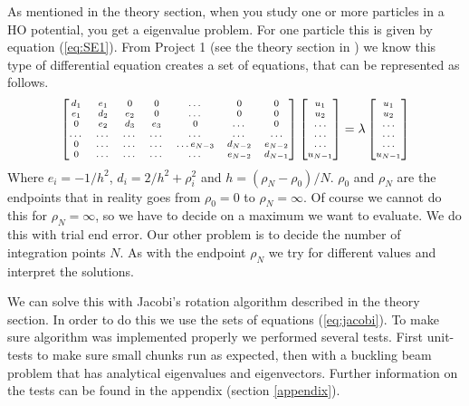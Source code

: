 \documentclass[reprint,english,notitlepage,nofootinbib]{revtex4-1}  %
\begin{document}
As mentioned in the theory section, when you study one or more particles in a HO potential, you get a eigenvalue problem. For one particle this is given by equation (\ref{eq:SE1}). From Project 1 (see the theory section in \citep{project1}) we know this type of differential equation creates a set of equations, that can be represented as follows.
\begin{equation}
	\label{eq:discrete_2nd_deriv_mat}
	\scriptsize{\begin{bmatrix}d_1 & e_1 & 0   & 0    & \dots  &0     & 0 \\
			e_1 & d_2 & e_2 & 0    & \dots  &0     &0 \\
			0   & e_2 & d_3 & e_3  &0       &\dots & 0\\
			\dots  & \dots & \dots & \dots  &\dots      &\dots & \dots\\
			0   & \dots & \dots & \dots  &\dots  e_{N-3}     &d_{N-2} & e_{N-2}\\
			0   & \dots & \dots & \dots  &\dots       &e_{N-2} & d_{N-1}
		\end{bmatrix}  \begin{bmatrix} u_{1} \\
			u_{2} \\
			\dots\\ \dots\\ \dots\\
			u_{N-1}
		\end{bmatrix}=\lambda \begin{bmatrix} u_{1} \\
			u_{2} \\
			\dots\\ \dots\\ \dots\\
			u_{N-1}
	\end{bmatrix}}
\end{equation}
Where $e_i = -1/h^2$, $d_i = 2/h^2 + \rho_i^2$ and $h = (\rho_N - \rho_0)/N$. $\rho_0$ and $\rho_N$ are the endpoints that in reality goes from $\rho_0 = 0$ to $\rho_N=\infty$. Of course we cannot do this for $\rho_N = \infty$, so we have to decide on a maximum we want to evaluate. We do this with trial end error. Our other problem is to decide the number of integration points $N$. As with the endpoint $\rho_N$ we try for different values and interpret the solutions.

We can solve this with Jacobi's rotation algorithm described in the theory section. In order to do this we use the sets of equations (\ref{eq:jacobi}). To make sure algorithm was implemented properly we performed several tests. First unit-tests to make sure small chunks run as expected, then with a buckling beam problem that has analytical eigenvalues and eigenvectors. Further information on the tests can be found in the appendix (section \ref{appendix}).
\end{document}
